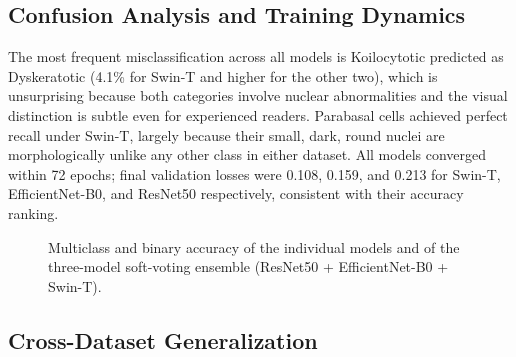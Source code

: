 \documentclass[conference]{IEEEtran}
\begin{document}
\subsection{Confusion Analysis and Training Dynamics}

The most frequent misclassification across all models is Koilocytotic predicted as Dyskeratotic (4.1\% for Swin-T and higher for the other two), which is unsurprising because both categories involve nuclear abnormalities and the visual distinction is subtle even for experienced readers. Parabasal cells achieved perfect recall under Swin-T, largely because their small, dark, round nuclei are morphologically unlike any other class in either dataset. All models converged within 72 epochs; final validation losses were 0.108, 0.159, and 0.213 for Swin-T, EfficientNet-B0, and ResNet50 respectively, consistent with their accuracy ranking.

\begin{figure}[t]
\centering
{}
\caption{Multiclass and binary accuracy of the individual models and of the three-model soft-voting ensemble (ResNet50 + EfficientNet-B0 + Swin-T).}
\label{fig:accbar}
\end{figure}

\subsection{Cross-Dataset Generalization}
\label{sec:cross}
\end{document}
